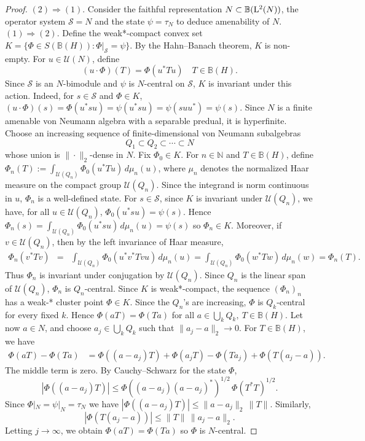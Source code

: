 \documentclass[12pt]{amsart} %
\theoremstyle{plain}
\theoremstyle{definition}
\newcommand{\N}{\mathbb{N}}
\begin{document}
\begin{proof}$(2)\Rightarrow(1)$. Consider the faithful representation $N\subset\mathbb{B}({\rm L}^2(N))$, the operator system $\mathcal{S}=N$ and the state $\psi=\tau_N$ to deduce amenability of $N$.
\medskip
\noindent$(1)\Rightarrow(2)$. Define the weak*-compact convex set $K=\{\Phi\in S(\mathbb{B}(H)):\Phi|_{\mathcal S}=\psi\}$. By the Hahn--Banach theorem, \(K\) is non-empty.
For \(u\in\mathcal U(N)\), define
$$(u\cdot\Phi)(T)=\Phi(u^*Tu)\quad T\in\mathbb{B}(H).$$
Since \(\mathcal S\) is an \(N\)-bimodule and \(\psi\) is \(N\)-central on
\(\mathcal S\), \(K\) is invariant under this action. Indeed, for
\(s\in\mathcal S\) and $\Phi\in K$, $(u\cdot\Phi)(s)=\Phi(u^*su)=\psi(u^*su)=\psi(suu^*)=\psi(s)$. Since \(N\) is a finite amenable von Neumann algebra with a separable predual, it is hyperfinite.
Choose an increasing sequence of finite-dimensional von Neumann subalgebras
$$Q_1\subset Q_2\subset\cdots\subset N$$
whose union is \(\|\cdot\|_2\)-dense in \(N\). Fix \(\Phi_0\in K\). For \(n\in\N\) and $T\in\mathbb{B}(H)$, define $\Phi_n(T):=\int_{\mathcal U(Q_n)}\Phi_0(u^*Tu)\,d\mu_n(u)$,
where \(\mu_n\) denotes the normalized Haar measure on the compact group $\mathcal{U}(Q_n)$. Since the integrand is norm
continuous in \(u\), \(\Phi_n\) is a well-defined state. For \(s\in\mathcal S\), since \(K\) is invariant under \(\mathcal U(Q_n)\), we have, for all $u\in\mathcal U(Q_n)$, $\Phi_0(u^*su)=\psi(s)$. Hence $\Phi_n(s) =\int_{\mathcal U(Q_n)}\Phi_0(u^*su)\,d\mu_n(u)=\psi(s)$ so \(\Phi_n\in K\). Moreover, if \(v\in\mathcal U(Q_n)\), then by the left
invariance of Haar measure,
\begin{eqnarray*}
        \Phi_n(v^*Tv)
        &=&\int_{\mathcal U(Q_n)}\Phi_0(u^*v^*Tvu)\,d\mu_n(u)
         = \int_{\mathcal U(Q_n)}\Phi_0(w^*Tw)\,d\mu_n(w)=\Phi_n(T).
\end{eqnarray*}
Thus \(\Phi_n\) is invariant under conjugation by \(\mathcal U(Q_n)\). Since $Q_n$ is the linear span of \(\mathcal U(Q_n)\), $\Phi_n$ is \(Q_n\)-central. Since $K$ is weak*-compact, the sequence \((\Phi_n)_n\) has a weak-* cluster point $\Phi\in K$. Since
the \(Q_n\)'s are increasing, \(\Phi\) is \(Q_k\)-central for every fixed
\(k\). Hence $\Phi(aT)=\Phi(Ta)$ for all  $a\in \bigcup_k Q_k,\ T\in\mathbb{B}(H)$. Let now \(a\in N\), and choose \(a_j\in\bigcup_k Q_k\) such that $\|a_j-a\|_2\longrightarrow 0$. For \(T\in\mathbb{B}(H)\), we have
\[
\begin{aligned}
        \Phi(aT)-\Phi(Ta)
        &=
        \Phi((a-a_j)T)
        +
        \Phi(a_jT)-\Phi(Ta_j)
        +
        \Phi(T(a_j-a)).
\end{aligned}
\]
The middle term is zero. By Cauchy--Schwarz for the state \(\Phi\),
\[
        |\Phi((a-a_j)T)|
        \leq
        \Phi((a-a_j)(a-a_j)^*)^{1/2}\,\Phi(T^*T)^{1/2}.
\]
Since \(\Phi|_N=\psi|_N=\tau_N\) we have $|\Phi((a-a_j)T)|\leq  \|a-a_j\|_2\,\|T\|$. Similarly,
\[
        |\Phi(T(a_j-a))|
        \leq
        \|T\|\,\|a_j-a\|_2.
\]
Letting \(j\to\infty\), we obtain $\Phi(aT)=\Phi(Ta)$ so \(\Phi\) is \(N\)-central.\end{proof}
\end{document}
